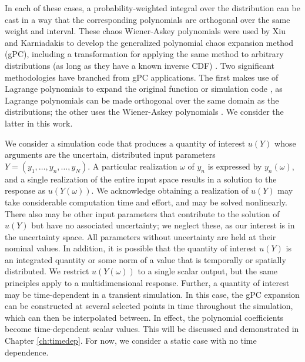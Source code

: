 In each of these cases, a probability-weighted
integral over the distribution can be cast in a way that the corresponding polynomials are orthogonal over the
same weight and interval.  These chaos Wiener-Askey polynomials were used by Xiu and Karniadakis to develop
the generalized polynomial chaos expansion method (gPC), including a transformation for applying the same
method to arbitrary distributions (as long as they have a known inverse CDF) \cite{xiu}.  Two significant
methodologies have branched from gPC applications.  The first makes use of Lagrange polynomials to expand the
original function or simulation code \cite{SCLagrange}, as Lagrange polynomials can be made orthogonal over the same domain as the
distributions; the other uses the Wiener-Askey polynomials \cite{xiu}.  We consider the latter in this work.

We consider a simulation code that produces a quantity of interest $u(Y)$ whose
arguments are the uncertain, distributed input
parameters $Y=(y_1,\ldots,y_n,\ldots,y_N)$.  A particular realization $\omega$ of $y_n$ is expressed by
$y_n(\omega)$, and a single realization of the entire input space results in a solution to the response as
$u(Y(\omega))$.  We acknowledge obtaining a realization of $u(Y)$ may take considerable computation time and
effort, and may be solved nonlinearly.  There also may be other input parameters that
contribute to the solution of $u(Y)$ but have no associated uncertainty; we neglect these, as our interest 
is in the uncertainty space.  All parameters without uncertainty are held at their nominal values.
In addition, it is possible that the quantity of interest $u(Y)$ is an integrated quantity or some norm of a
value that is temporally or spatially distributed. We restrict $u(Y(\omega))$ to a single scalar
output, but the same principles apply to a multidimensional response.  Further, a quantity of interest may be
time-dependent in a transient simulation.  In this case, the gPC expansion can be constructed at several selected points
in time throughout the simulation, which can then be interpolated between.  In effect, the polynomial
coefficients become time-dependent scalar values.  This will be discussed and demonstrated in Chapter \ref{ch:timedep}. 
For now, we consider a static case with no time dependence.

